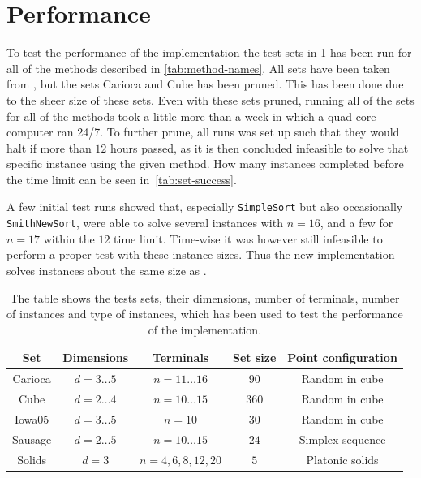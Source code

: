 \section{Performance}
\label{sec:performance}

To test the performance of the implementation the test sets in
\cref{tab:test-sets} has been run for all of the methods described in
\cref{tab:method-names}. All sets have been taken from \textcite{fonseca2014},
but the sets Carioca and Cube has been pruned. This has been done due to the
sheer size of these sets. Even with these sets pruned, running all of the sets
for all of the methods took a little more than a week in which a quad-core
computer ran 24/7. To further prune, all runs was set up such that they would
halt if more than $12$ hours passed, as it is then concluded infeasible to solve
that specific instance using the given method. How many instances completed
before the time limit can be seen in~\cref{tab:set-success}.

A few initial test runs showed that, especially \texttt{SimpleSort} but also
occasionally \texttt{SmithNewSort}, were able to solve several instances with
$n=16$, and a few for $n=17$ within the $12$ time limit. Time-wise it was
however still infeasible to perform a proper test with these instance sizes.
Thus the new implementation solves instances about the same size as
\textcite{fonseca2014}.

\begin{table}[htbp]
  \centering
  \begin{tabular}{ccccc}
    \toprule
    Set     & Dimensions       & Terminals             & Set size & Point configuration \\
    \midrule
    Carioca & $d = 3 \ldots 5$ & $n = 11 \ldots 16$    & $90$     & Random in cube      \\
    Cube    & $d = 2 \ldots 4$ & $n = 10 \ldots 15$    & $360$    & Random in cube      \\
    Iowa05  & $d = 3 \ldots 5$ & $n = 10$              & $30$     & Random in cube      \\
    Sausage & $d = 2 \ldots 5$ & $n = 10 \ldots 15$    & $24$     & Simplex sequence    \\
    Solids  & $d = 3$          & $n = 4, 6, 8, 12, 20$ & $5$      & Platonic solids     \\
    \bottomrule
  \end{tabular}
  \caption[Test sets used to test performance]{The table shows the tests sets,
    their dimensions, number of terminals, number of instances and type of instances,
    which has been used to test the performance of the implementation.\label{tab:test-sets}}
\end{table}

